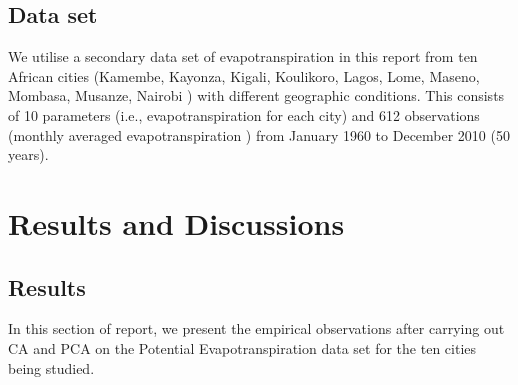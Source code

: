 \documentclass[12pt,a4paper]{article}
\begin{document}
\subsection{Data set}
We utilise a secondary data set of evapotranspiration in this report from ten African cities (Kamembe,  Kayonza,  Kigali,  Koulikoro,  Lagos,  Lome,  Maseno,  Mombasa,  Musanze,  Nairobi ) with different geographic conditions.  This consists of 10 parameters (i.e.,   evapotranspiration for each city) and 612 observations (monthly averaged evapotranspiration ) from January 1960 to December 2010 (50 years).
\pagebreak
\section{Results and Discussions}
\subsection{Results}
In this section of report, we present the empirical observations after carrying out CA and PCA on the Potential Evapotranspiration data set for the ten cities being studied.
\end{document}
